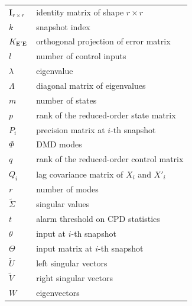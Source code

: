 \begin{table}[ht]
\begin{tabular}{p{2cm}l}
	\(\textbf{I}_{r \times r}\)    & identity matrix of shape \(r \times r\)                 \\
	\(k\)                          & snapshot index                                          \\
	\(K _{\text{E'E}}\)                & orthogonal projection of error matrix                   \\
	\(l\)                          & number of control inputs                                \\
	\(\lambda \)                   & eigenvalue                                              \\
	\(\Lambda \)                   & diagonal matrix of eigenvalues                          \\
	\(m\)                          & number of states                                        \\
	\(p\)                          & rank of the reduced-order state matrix                  \\
	\(P_i\)                        & precision matrix at \(i\)-th snapshot                   \\
	\(\Phi \)                      & DMD modes                                               \\
	\(q\)                          & rank of the reduced-order control matrix                \\
	\(Q_i\)                        & lag covariance matrix of \(X_i\) and \(X'_i\)           \\
	\(r\)                          & number of modes                                         \\
	\(\tilde{\Sigma} \)            & singular values                                         \\
	\(t\)                          & alarm threshold on CPD statistics                       \\
	\(\theta \)                    & input at \(i\)-th snapshot                              \\
	\(\Theta \)                    & input matrix at \(i\)-th snapshot                       \\
	\(\tilde{U}\)                  & left singular vectors                                   \\
	\(\tilde{V}\)                  & right singular vectors                                  \\
	\( W \)                        & eigenvectors                                            \\

\end{tabular}
\end{table}
